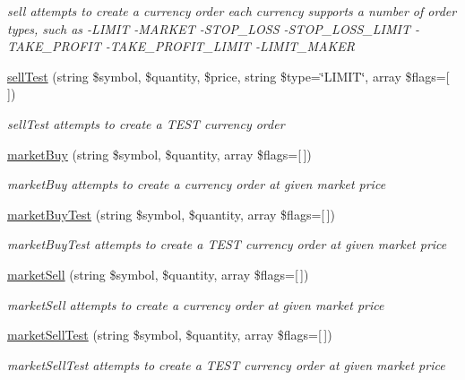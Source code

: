 \begin{DoxyCompactItemize}
\begin{DoxyCompactList}\small\item\em sell attempts to create a currency order each currency supports a number of order types, such as -\/\-L\-I\-M\-I\-T -\/\-M\-A\-R\-K\-E\-T -\/\-S\-T\-O\-P\-\_\-\-L\-O\-S\-S -\/\-S\-T\-O\-P\-\_\-\-L\-O\-S\-S\-\_\-\-L\-I\-M\-I\-T -\/\-T\-A\-K\-E\-\_\-\-P\-R\-O\-F\-I\-T -\/\-T\-A\-K\-E\-\_\-\-P\-R\-O\-F\-I\-T\-\_\-\-L\-I\-M\-I\-T -\/\-L\-I\-M\-I\-T\-\_\-\-M\-A\-K\-E\-R \end{DoxyCompactList}\item 
\hyperlink{classBinance_1_1API_a67841995467768588781cde190e59235}{sell\-Test} (string \$symbol, \$quantity, \$price, string \$type=\char`\"{}L\-I\-M\-I\-T\char`\"{}, array \$flags=\mbox{[}$\,$\mbox{]})
\begin{DoxyCompactList}\small\item\em sell\-Test attempts to create a T\-E\-S\-T currency order \end{DoxyCompactList}\item 
\hyperlink{classBinance_1_1API_aa6156e4c8d03bbdd8c16bbb18ea75646}{market\-Buy} (string \$symbol, \$quantity, array \$flags=\mbox{[}$\,$\mbox{]})
\begin{DoxyCompactList}\small\item\em market\-Buy attempts to create a currency order at given market price \end{DoxyCompactList}\item 
\hyperlink{classBinance_1_1API_ad11565e34ba1c715ac2478ee7f9aab6e}{market\-Buy\-Test} (string \$symbol, \$quantity, array \$flags=\mbox{[}$\,$\mbox{]})
\begin{DoxyCompactList}\small\item\em market\-Buy\-Test attempts to create a T\-E\-S\-T currency order at given market price \end{DoxyCompactList}\item 
\hyperlink{classBinance_1_1API_a72d07ceea281b273d65a487efc02e31e}{market\-Sell} (string \$symbol, \$quantity, array \$flags=\mbox{[}$\,$\mbox{]})
\begin{DoxyCompactList}\small\item\em market\-Sell attempts to create a currency order at given market price \end{DoxyCompactList}\item 
\hyperlink{classBinance_1_1API_a77eaa982d0ca78fbce80d6203213af28}{market\-Sell\-Test} (string \$symbol, \$quantity, array \$flags=\mbox{[}$\,$\mbox{]})
\begin{DoxyCompactList}\small\item\em market\-Sell\-Test attempts to create a T\-E\-S\-T currency order at given market price \end{DoxyCompactList}\item 

\end{DoxyCompactItemize}
